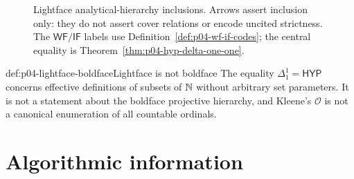 \begin{figure}[htbp]
\centering
{}
\caption{Lightface analytical-hierarchy inclusions.
Arrows assert inclusion only: they do not assert cover relations or encode
uncited strictness.  The \(\mathsf{WF}/\mathsf{IF}\) labels use
Definition~\ref{def:p04-wf-if-codes}; the central equality is
Theorem~\ref{thm:p04-hyp-delta-one-one}.}
\label{fig:p04-analytical-hierarchy}
\end{figure}

\begin{hbwarning}{def:p04-lightface-boldface}{Lightface is not boldface}
The equality \(\Delta^1_1=\mathsf{HYP}\) concerns effective definitions of
subsets of \(\mathbb{N}\) without arbitrary set parameters.  It is not a statement
about the boldface projective hierarchy, and Kleene's \(\mathcal O\) is not a
canonical enumeration of all countable ordinals.
\end{hbwarning}

\section{Algorithmic information}
\label{sec:p04-kolmogorov-complexity}

